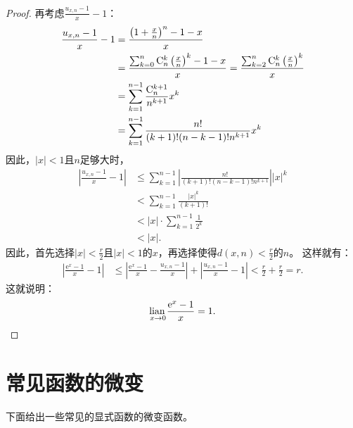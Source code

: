 \documentclass[12pt,UTF8]{ctexbook}
\begin{document}
\begin{appendix}
\begin{proof}
    再考虑$\frac{u_{x,n} - 1}{x} - 1$：
    \begin{align*}
        \frac{u_{x,n} - 1}{x} - 1 &= \frac{\left(1 + \frac{x}{n}\right)^{n} - 1 - x}{x}  \\
        &= \frac{\sum_{k=0}^n \mathrm{C}_{n}^{k} \left(\frac{x}{n}\right)^k - 1 - x}{x} = \frac{\sum_{k=2}^n \mathrm{C}_{n}^{k} \left(\frac{x}{n}\right)^k}{x}  \\
        &= \sum_{k=1}^{n-1} \frac{\mathrm{C}_{n}^{k+1}}{n^{k+1}} x^k  \\
        &= \sum_{k=1}^{n-1} \frac{n!}{(k+1)!(n-k-1)!n^{k+1}} x^k  
    \end{align*}
    因此，$|x|<1$且$n$足够大时，
    \begin{align*}
        \left| \frac{u_{x,n} - 1}{x} - 1 \right| &\leqslant \sum_{k=1}^{n-1} \left|\frac{n!}{(k+1)!(n-k-1)!n^{k+1}}\right| |x|^k  \\
        &< \sum_{k=1}^{n-1} \frac{|x|^k}{(k+1)!}  \\
        &< |x| \cdot \sum_{k=1}^{n-1} \frac{1}{2^k}  \\
        &< |x|.  
    \end{align*}
    因此，首先选择$|x| < \frac{r}{2}$且$|x|<1$的$x$，再选择使得$d(x, n) < \frac{r}{2}$的$n$。
    这样就有：
    \begin{align*}
        \left|\frac{\mathrm{e}^x - 1}{x} - 1\right| &\leqslant \left|\frac{\mathrm{e}^x - 1}{x} - \frac{u_{x,n} - 1}{x}\right| + \left|\frac{u_{x,n} - 1}{x} - 1\right|  < \frac{r}{2} + \frac{r}{2} = r.   
    \end{align*}
    这就说明：
    $$\underset{x\to 0}{\operatorname{lian}\,} \frac{\mathrm{e}^x - 1}{x} = 1.$$
\end{proof}

\section{常见函数的微变}

下面给出一些常见的显式函数的微变函数。


\end{appendix}
\end{document}
